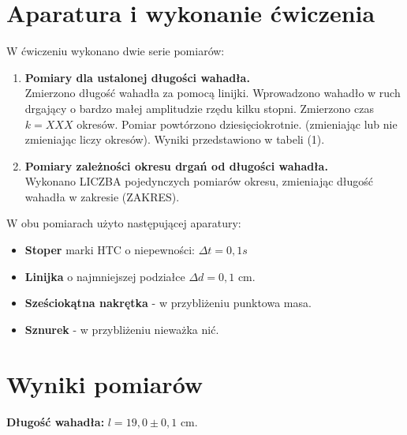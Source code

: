 \documentclass{article}
\begin{document}
\section{Aparatura i wykonanie ćwiczenia}
	W ćwiczeniu wykonano dwie serie pomiarów:
	\begin{enumerate}%
		\item \textbf{Pomiary dla ustalonej długości wahadła.}\\
			Zmierzono długość wahadła za pomocą linijki. Wprowadzono wahadło w ruch drgający o bardzo małej amplitudzie rzędu kilku stopni. Zmierzono czas $k= XXX$ okresów. Pomiar powtórzono dziesięciokrotnie. (zmieniając lub nie zmieniając liczy okresów). Wyniki przedstawiono w tabeli (1).
		\item \textbf{Pomiary zależności okresu drgań od długości wahadła.}\\
			Wykonano LICZBA pojedynczych pomiarów okresu, zmieniając długość wahadła w zakresie (ZAKRES).
	\end{enumerate}
	W obu pomiarach użyto następującej aparatury:
	\begin{itemize} %
		\item \textbf{Stoper} marki HTC o niepewności: $\Delta t = 0,1s$
		\item \textbf{Linijka} o najmniejszej podziałce $\Delta d = 0,1$ cm.
		\item \textbf{Sześciokątna nakrętka} - w przybliżeniu punktowa masa.
		\item \textbf{Sznurek} - w przybliżeniu nieważka nić. %
	\end{itemize}
	
\newpage

\section{Wyniki pomiarów}

	\setlength\extrarowheight{2pt} %
\textbf{Długość wahadła:} $l = 19,0 \pm 0,1$ cm. %
\end{document}
